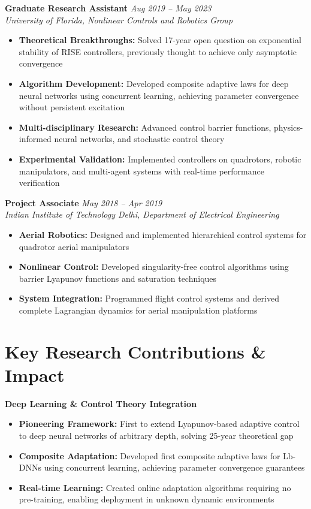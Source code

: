\documentclass[10pt, letterpaper]{article}
\begin{document}
\textbf{Graduate Research Assistant} \hfill \textit{Aug 2019 -- May 2023}\\
\textit{University of Florida, Nonlinear Controls and Robotics Group}
\begin{itemize}[leftmargin=20pt, itemsep=1pt]
    \item \textbf{Theoretical Breakthroughs:} Solved 17-year open question on exponential stability of RISE controllers, previously thought to achieve only asymptotic convergence
    \item \textbf{Algorithm Development:} Developed composite adaptive laws for deep neural networks using concurrent learning, achieving parameter convergence without persistent excitation
    \item \textbf{Multi-disciplinary Research:} Advanced control barrier functions, physics-informed neural networks, and stochastic control theory
    \item \textbf{Experimental Validation:} Implemented controllers on quadrotors, robotic manipulators, and multi-agent systems with real-time performance verification
\end{itemize}

\textbf{Project Associate} \hfill \textit{May 2018 -- Apr 2019}\\
\textit{Indian Institute of Technology Delhi, Department of Electrical Engineering}
\begin{itemize}[leftmargin=20pt, itemsep=1pt]
    \item \textbf{Aerial Robotics:} Designed and implemented hierarchical control systems for quadrotor aerial manipulators
    \item \textbf{Nonlinear Control:} Developed singularity-free control algorithms using barrier Lyapunov functions and saturation techniques
    \item \textbf{System Integration:} Programmed flight control systems and derived complete Lagrangian dynamics for aerial manipulation platforms
\end{itemize}

\section{Key Research Contributions \& Impact}

\textbf{Deep Learning \& Control Theory Integration}
\begin{itemize}[leftmargin=20pt, itemsep=1pt]
    \item \textbf{Pioneering Framework:} First to extend Lyapunov-based adaptive control to deep neural networks of arbitrary depth, solving 25-year theoretical gap
    \item \textbf{Composite Adaptation:} Developed first composite adaptive laws for Lb-DNNs using concurrent learning, achieving parameter convergence guarantees
    \item \textbf{Real-time Learning:} Created online adaptation algorithms requiring no pre-training, enabling deployment in unknown dynamic environments
\end{itemize}
\end{document}
